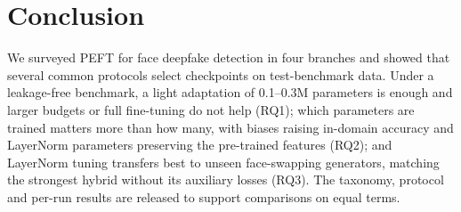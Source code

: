 \documentclass[fonts]{icst}
\begin{document}
\section{Conclusion}
We surveyed PEFT for face deepfake detection in four branches and showed that several common protocols select checkpoints on test-benchmark data. Under a leakage-free benchmark, a light adaptation of 0.1--0.3M parameters is enough and larger budgets or full fine-tuning do not help (RQ1); which parameters are trained matters more than how many, with biases raising in-domain accuracy and LayerNorm parameters preserving the pre-trained features (RQ2); and LayerNorm tuning transfers best to unseen face-swapping generators, matching the strongest hybrid without its auxiliary losses (RQ3). The taxonomy, protocol and per-run results are released to support comparisons on equal terms.
\end{document}

